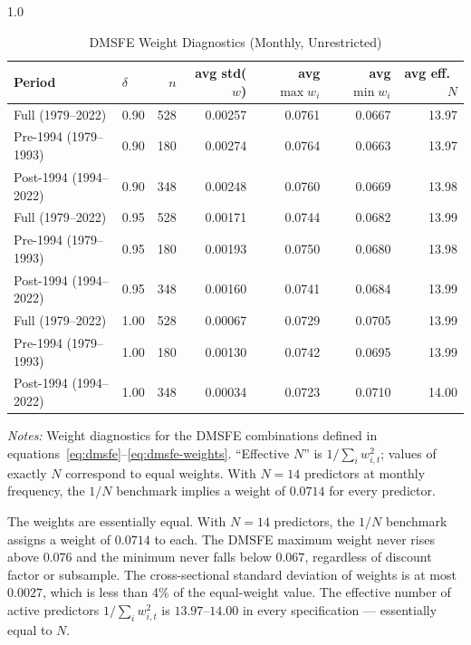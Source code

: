 \documentclass[a4paper,11pt]{article}
\begin{document}
\begin{spacing}{1.0}
\begin{table}[H]
\centering
\caption{DMSFE Weight Diagnostics (Monthly, Unrestricted)}
\label{tab:dmsfe_weights}
\small
\renewcommand{\arraystretch}{1.05}
\begin{tabular}{@{}llrrrrr@{}}
\toprule
Period & $\delta$ & $n$ & avg std($w$) & avg $\max w_i$ & avg $\min w_i$ & avg eff.~$N$ \\
\midrule
Full (1979--2022)   & 0.90 & 528 & 0.00257 & 0.0761 & 0.0667 & 13.97 \\
Pre-1994 (1979--1993) & 0.90 & 180 & 0.00274 & 0.0764 & 0.0663 & 13.97 \\
Post-1994 (1994--2022) & 0.90 & 348 & 0.00248 & 0.0760 & 0.0669 & 13.98 \\[0.3ex]
Full (1979--2022)   & 0.95 & 528 & 0.00171 & 0.0744 & 0.0682 & 13.99 \\
Pre-1994 (1979--1993) & 0.95 & 180 & 0.00193 & 0.0750 & 0.0680 & 13.98 \\
Post-1994 (1994--2022) & 0.95 & 348 & 0.00160 & 0.0741 & 0.0684 & 13.99 \\[0.3ex]
Full (1979--2022)   & 1.00 & 528 & 0.00067 & 0.0729 & 0.0705 & 13.99 \\
Pre-1994 (1979--1993) & 1.00 & 180 & 0.00130 & 0.0742 & 0.0695 & 13.99 \\
Post-1994 (1994--2022) & 1.00 & 348 & 0.00034 & 0.0723 & 0.0710 & 14.00 \\
\bottomrule
\end{tabular}
\vspace{0.4em}
\begin{minipage}{0.95\textwidth}
\footnotesize
\textit{Notes:} Weight diagnostics for the DMSFE combinations
defined in equations~\eqref{eq:dmsfe}--\eqref{eq:dmsfe-weights}.
``Effective $N$'' is $1/\sum_i w_{i,t}^2$; values of exactly $N$
correspond to equal weights. With $N=14$ predictors at monthly
frequency, the $1/N$ benchmark implies a weight of $0.0714$ for every
predictor.
\end{minipage}
\end{table}
\end{spacing}

The weights are essentially equal. With $N=14$ predictors, the $1/N$
benchmark assigns a weight of $0.0714$ to each. The DMSFE maximum weight
never rises above $0.076$ and the minimum never falls below $0.067$,
regardless of discount factor or subsample. The cross-sectional standard
deviation of weights is at most $0.0027$, which is less than 4\% of the
equal-weight value. The effective number of active predictors
$1/\sum_i w_{i,t}^2$ is $13.97$--$14.00$ in every specification ---
essentially equal to $N$.
\end{document}
